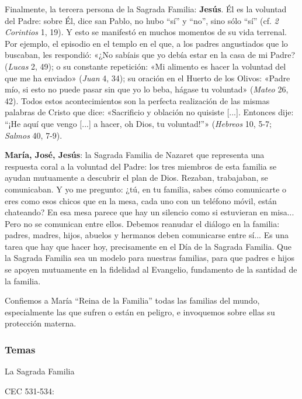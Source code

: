 \documentclass[]{article}
\begin{document}
Finalmente, la tercera persona de la Sagrada Familia: \textbf{Jesús}. Él
es la voluntad del Padre: sobre Él, dice san Pablo, no hubo ``sí'' y
``no'', sino sólo ``sí'' (cf. \emph{2 Corintios} 1, 19). Y esto se
manifestó en muchos momentos de su vida terrenal. Por ejemplo, el
episodio en el templo en el que, a los padres angustiados que lo
buscaban, les respondió: «¿No sabíais que yo debía estar en la casa de
mi Padre? (\emph{Lucas} 2, 49); o su constante repetición: «Mi alimento
es hacer la voluntad del que me ha enviado» (\emph{Juan} 4, 34); su
oración en el Huerto de los Olivos: «Padre mío, si esto no puede pasar
sin que yo lo beba, hágase tu voluntad» (\emph{Mateo} 26, 42). Todos
estos acontecimientos son la perfecta realización de las mismas palabras
de Cristo que dice: «Sacrificio y oblación no quisiste {[}...{]}.
Entonces dije: ``¡He aquí que vengo {[}...{]} a hacer, oh Dios, tu
voluntad!''» (\emph{Hebreos} 10, 5-7; \emph{Salmos} 40, 7-9).

\textbf{María, José, Jesús}: la Sagrada Familia de Nazaret que
representa una respuesta coral a la voluntad del Padre: los tres
miembros de esta familia se ayudan mutuamente a descubrir el plan de
Dios. Rezaban, trabajaban, se comunicaban. Y yo me pregunto: ¿tú, en tu
familia, sabes cómo comunicarte o eres como esos chicos que en la mesa,
cada uno con un teléfono móvil, están chateando? En esa mesa parece que
hay un silencio como si estuvieran en misa... Pero no se comunican entre
ellos. Debemos reanudar el diálogo en la familia: padres, madres, hijos,
abuelos y hermanos deben comunicarse entre sí... Es una tarea que hay
que hacer hoy, precisamente en el Día de la Sagrada Familia. Que la
Sagrada Familia sea un modelo para nuestras familias, para que padres e
hijos se apoyen mutuamente en la fidelidad al Evangelio, fundamento de
la santidad de la familia.

Confiemos a María ``Reina de la Familia'' todas las familias del mundo,
especialmente las que sufren o están en peligro, e invoquemos sobre
ellas su protección materna.

\protect\hypertarget{_Toc448708372}{}{\protect\hypertarget{_Toc448709458}{}{\protect\hypertarget{_Toc449554460}{}{}}}

\subsubsection{Temas}\label{temas-8}

La Sagrada Familia

CEC 531-534:
\end{document}
